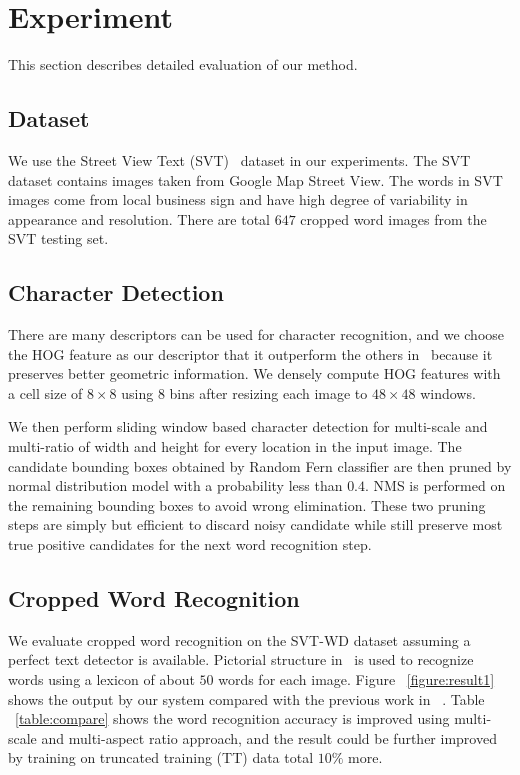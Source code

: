 \documentclass[10pt,twocolumn,letterpaper]{article}
\begin{document}
\section{Experiment}

This section describes detailed evaluation of our method.

\subsection{Dataset}

We use the Street View Text (SVT)~\cite{417} dataset in our experiments. The SVT dataset contains images taken from Google Map Street View. The words in SVT images come from local business sign and have high degree of variability in appearance and resolution. There are total $647$ cropped word images from the SVT testing set.

\subsection{Character Detection}

There are many descriptors can be used for character recognition, and we choose the HOG feature as our descriptor that it outperform the others in~\cite{117} because it preserves better geometric information. We densely compute HOG features with a cell size of $8 \times 8$ using $8$ bins after resizing each image to $48 \times 48$ windows.

We then perform sliding window based character detection for multi-scale and multi-ratio of width and height for every location in the input image. The candidate bounding boxes obtained by Random Fern classifier are then pruned by normal distribution model with a probability less than $0.4$. NMS is performed on the remaining bounding boxes to avoid wrong elimination. These two pruning steps are simply but efficient to discard noisy candidate while still preserve most true positive candidates for the next word recognition step.

\subsection{Cropped Word Recognition}

We evaluate cropped word recognition on the SVT-WD dataset assuming a perfect text detector is available. Pictorial structure in~\cite{417} is used to recognize words using a lexicon of about $50$ words for each image. Figure ~\ref{figure:result1} shows the output by our system compared with the previous work in ~\cite{417}. Table ~\ref{table:compare} shows the word recognition accuracy is improved using multi-scale and multi-aspect ratio approach, and the result could be further improved by training on truncated training (TT) data total $10\%$ more.
\end{document}
